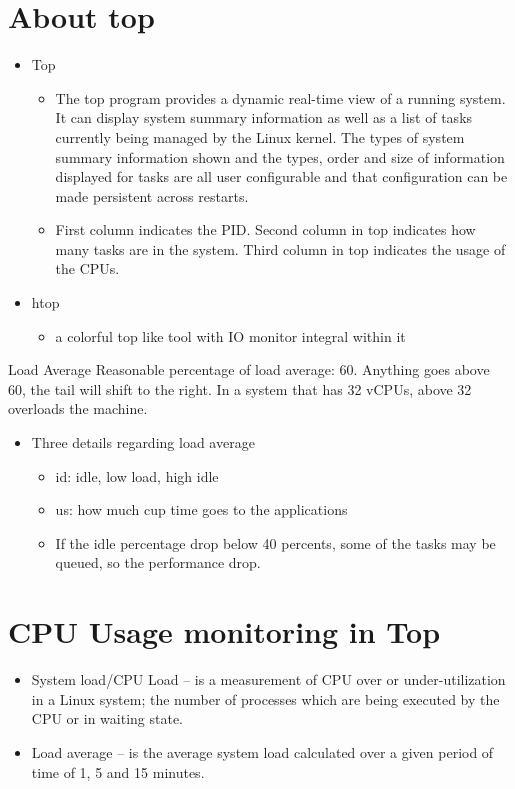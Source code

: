 \documentclass[fancy,11pt,titlestyle=display]{style/elegantbook}
\begin{document}
\section{About top}
\begin{itemize}
    \item Top
    \begin{itemize}
        \item  The top program provides a dynamic real-time view of a running system. It can display system summary information as well as a list of tasks currently being managed by the Linux kernel. The types of system summary information shown and the types, order and size of information displayed for tasks are all user configurable and that configuration can be made persistent across restarts.
        \item First column indicates the PID. Second column in top indicates how many tasks are in the system. Third column in top indicates the usage of the CPUs. 
    \end{itemize}
        

    \item htop
    \begin{itemize}
        \item a colorful top like tool with IO monitor integral within it 
    \end{itemize}
\end{itemize} 

\begin{definition}{Load Average}{}
        Reasonable percentage of load average: 60. Anything goes above 60, the tail will shift to the right. In a system that has 32 vCPUs, above 32 overloads the machine.
\end{definition}
\begin{itemize}
    \item Three details regarding load average
    \begin{itemize}
        \item id: idle, low load, high idle
        \item us: how much cup time goes to the applications
        \item If the idle percentage drop below 40 percents, some of the tasks may be queued, so the performance drop.
    \end{itemize}
\end{itemize}

\section{CPU Usage monitoring in Top}
 \begin{itemize}
        \item System load/CPU Load – is a measurement of CPU over or under-utilization in a Linux system; the number of processes which are being executed by the CPU or in waiting state.

        \item Load average – is the average system load calculated over a given period of time of 1, 5 and 15 minutes.
    \end{itemize}
    
\end{document}

